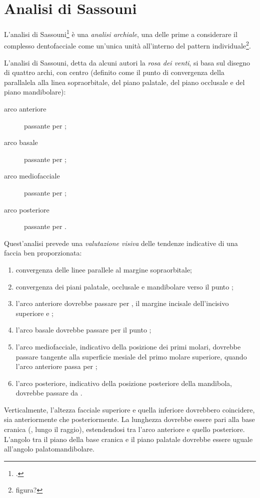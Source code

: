 \chapter{Analisi di Sassouni}
L'analisi di Sassouni\footcite{Sassouni1955,Sassouni1969} è una \textit{analisi archiale}, una delle prime a considerare il complesso dentofacciale come un'unica unità all'interno del pattern individuale\footnote{figura?}.

L'analisi di Sassouni, detta da alcuni autori la \textit{rosa dei venti}, si basa sul disegno di quattro archi, con centro  (definito come il punto di convergenza della parallalela alla linea sopraorbitale, del piano palatale, del piano occlusale e del piano mandibolare):

\begin{description}
\item[arco anteriore] passante per ;
\item[arco basale] passante per ;
\item[arco mediofacciale] passante per ;
\item[arco posteriore] passante per .
\end{description}

Quest'analisi prevede una \textit{valutazione visiva} delle tendenze indicative di una faccia ben proporzionata:

\begin{enumerate}
\item convergenza delle linee parallele al margine sopraorbitale;
\item convergenza dei piani palatale, occlusale e mandibolare verso il punto ;
\item l'arco anteriore dovrebbe passare per , il margine incisale dell'incisivo superiore e ;
\item l'arco basale dovrebbe passare per il punto ;
\item l'arco mediofacciale, indicativo della posizione dei primi molari, dovrebbe passare tangente alla superficie mesiale del primo molare superiore, quando l'arco anteriore passa per ;
\item l'arco posteriore, indicativo della posizione posteriore della mandibola, dovrebbe passare da .
\end{enumerate}

Verticalmente, l'altezza facciale superiore e quella inferiore dovrebbero coincidere, sia anteriormente che posteriormente. La lunghezza  dovrebbe essere pari alla base cranica (, lungo il raggio), estendendosi tra l'arco anteriore e quello posteriore. L'angolo tra il piano della base cranica e il piano palatale dovrebbe essere uguale all'angolo palatomandibolare.

